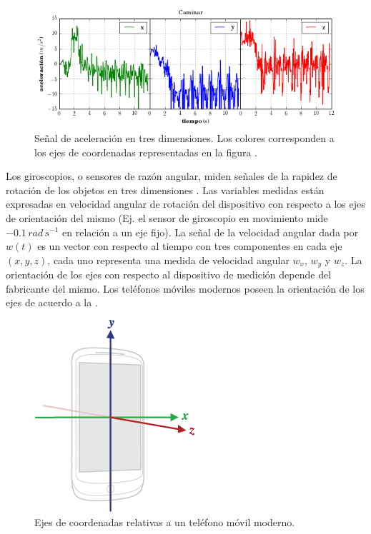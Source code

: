 \begin{figure}[!tbph]
\begin{centering}
\includegraphics[width=1\columnwidth]{capitulo-4/graphics/signal_a3d}
\par\end{centering}
\caption[Señal de aceleración]{\label{fig4:muestra-ac}Señal de aceleración en tres dimensiones.
Los colores corresponden a los ejes de coordenadas representadas en
la figura .}
\end{figure}

Los giroscopios, o sensores de razón angular, miden señales de la
rapidez de rotación de los objetos en tres dimensiones \cite{Goehl2007}.
Las variables medidas están expresadas en velocidad angular de rotación
del dispositivo con respecto a los ejes de orientación del mismo (Ej.
el sensor de giroscopio en movimiento mide \foreignlanguage{english}{$-0.1\,rad\,s^{-1}$}
en relación a un eje fijo). La señal de la velocidad angular dada
por $w(t)$ es un vector con respecto al tiempo con tres componentes
en cada eje $(x,y,z)$, cada uno representa una medida de velocidad
angular $w_{x}$, $w_{y}$ y $w_{z}$. La orientación de los ejes
con respecto al dispositivo de medición depende del fabricante del
mismo. Los teléfonos móviles modernos poseen la orientación de los
ejes de acuerdo a la .

\begin{figure}[!tbph]
\begin{centering}
\includegraphics[scale=0.7]{capitulo-4/graphics/axis_device}
\par\end{centering}
\caption[Sistemas de coordenadas relativo a dispositivo]{\label{fig4:axis-phone}Ejes de coordenadas relativas a un teléfono
móvil moderno.}

\end{figure}

